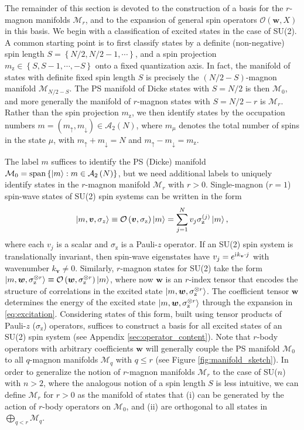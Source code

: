 \documentclass[nofootinbib,notitlepage,11pt]{revtex4-2}
\newcommand{\p}[1]{\left(#1\right)} %
\renewcommand{\set}[1]{\left\{#1\right\}} %
\renewcommand{\c}{\cdot} %
\newcommand{\m}{\bm} %
\newcommand{\1}{\mathds{1}}
\newcommand{\up}{\uparrow}
\newcommand{\dn}{\downarrow}
\renewcommand{\i}{\mathrm{i}\mkern1mu}
\newcommand{\z}{\text{z}}
\newcommand{\A}{\mathcal{A}}
\newcommand{\M}{\mathcal{M}}
\renewcommand{\O}{\mathcal{O}}
\newcommand{\oper}{\operatorname}
\begin{document}
The remainder of this section is devoted to the construction of a basis for the $r$-magnon manifolds $\M_r$, and to the expansion of general spin operators $\O\p{\m w,X}$ in this basis.
We begin with a classification of excited states in the case of SU(2).
A common starting point is to first classify states by a definite (non-negative) spin length $S=\set{N/2,N/2-1,\cdots}$, and a spin projection $m_\z\in\set{S,S-1,\cdots,-S}$ onto a fixed quantization axis.
In fact, the manifold of states with definite fixed spin length $S$ is precisely the $\p{N/2-S}$-magnon manifold $\M_{N/2-S}$.
The PS manifold of Dicke states with $S=N/2$ is then $\M_0$, and more generally the manifold of $r$-magnon states with $S=N/2-r$ is $\M_r$.
Rather than the spin projection $m_\z$, we then identify states by the occupation numbers $m=\p{m_\up,m_\dn}\in\A_2\p{N}$, where $m_\mu$ denotes the total number of spins in the state $\mu$, with $m_\up+m_\dn=N$ and $m_\up-m_\dn=m_\z$.

The label $m$ suffices to identify the PS (Dicke) manifold $\M_0=\oper{span}\set{\ket{m}:m\in\A_2\p{N}}$, but we need additional labels to uniquely identify states in the $r$-magnon manifold $\M_r$ with $r>0$.
Single-magnon ($r=1$) spin-wave states of SU(2) spin systems can be written in the form
\begin{align}
  \ket{m,\m v,\sigma_z}
  \equiv \O\p{\m v,\sigma_\z} \ket{m}
  = \sum_{j=1}^N v_j \sigma_\z^{(j)} \ket{m},
\end{align}
where each $v_j$ is a scalar and $\sigma_\z$ is a Pauli-$z$ operator.
If an SU(2) spin system is translationally invariant, then spin-wave eigenstates have $v_j=e^{\i k_{\m v}\c j}$ with wavenumber $k_{\m v}\ne0$.
Similarly, $r$-magnon states for SU(2) take the form $\ket{m,\m w,\sigma_\z^{\otimes r}} \equiv \O\p{\m w,\sigma_\z^{\otimes r}}\ket{m}$, where now $\m w$ is an $r$-index tensor that encodes the structure of correlations in the excited state $\ket{m,\m w,\sigma_\z^{\otimes r}}$.
The coefficient tensor $\m w$ determines the energy of the excited state $\ket{m,\m w,\sigma_\z^{\otimes r}}$ through the expansion in \eqref{eq:excitation}.
Considering states of this form, built using tensor products of Pauli-$z$ ($\sigma_\z$) operators, suffices to construct a basis for all excited states of an SU(2) spin system (see Appendix \ref{sec:operator_content}).
Note that $r$-body operators with arbitrary coefficients $\m w$ will generally couple the PS manifold $\M_0$ to all $q$-magnon manifolds $\M_q$ with $q\le r$ (see Figure \ref{fig:manifold_sketch}).
In order to generalize the notion of $r$-magnon manifolds $\M_r$ to the case of SU($n$) with $n>2$, where the analogous notion of a spin length $S$ is less intuitive, we can define $\M_r$ for $r>0$ as the manifold of states that (i) can be generated by the action of $r$-body operators on $\M_0$, and (ii) are orthogonal to all states in $\bigoplus_{q<r}\M_q$.
\end{document}
